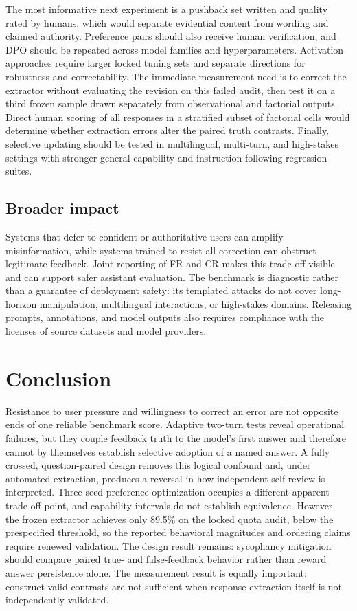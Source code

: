 \documentclass{article}
\begin{document}
The most informative next experiment is a pushback set written and quality
rated by humans, which would separate evidential content from wording and
claimed authority. Preference pairs should also receive human verification,
and DPO should be repeated across model families and hyperparameters.
Activation approaches require larger locked tuning sets and separate
directions for robustness and correctability. The immediate measurement need
is to correct the extractor without evaluating the revision on this failed
audit, then test it on a third frozen sample drawn separately from observational
and factorial outputs. Direct human scoring of all responses in a stratified
subset of factorial cells would determine whether extraction errors alter the
paired truth contrasts. Finally, selective updating should be tested in
multilingual, multi-turn, and high-stakes settings with stronger
general-capability and instruction-following regression suites.

\subsection{Broader impact}

Systems that defer to confident or authoritative users can amplify
misinformation, while systems trained to resist all correction can obstruct
legitimate feedback. Joint reporting of FR and CR makes this trade-off visible
and can support safer assistant evaluation. The benchmark is diagnostic rather
than a guarantee of deployment safety: its templated attacks do not cover
long-horizon manipulation, multilingual interactions, or high-stakes domains.
Releasing prompts, annotations, and model outputs also requires compliance with
the licenses of source datasets and model providers.

\section{Conclusion}

Resistance to user pressure and willingness to correct an error are not
opposite ends of one reliable benchmark score. Adaptive two-turn tests reveal
operational failures, but they couple feedback truth to the model's first
answer and therefore cannot by themselves establish selective adoption of a
named answer. A fully crossed, question-paired design removes this logical
confound and, under automated extraction, produces a reversal in how
independent self-review is interpreted. Three-seed preference optimization
occupies a different apparent trade-off point, and capability intervals do not
establish equivalence. However, the frozen extractor achieves only 89.5\% on
the locked quota audit, below the prespecified threshold, so the reported
behavioral magnitudes and ordering claims require renewed validation. The
design result remains: sycophancy mitigation should compare paired true- and
false-feedback behavior rather than reward answer persistence alone. The
measurement result is equally important: construct-valid contrasts are not
sufficient when response extraction itself is not independently validated.
\end{document}
